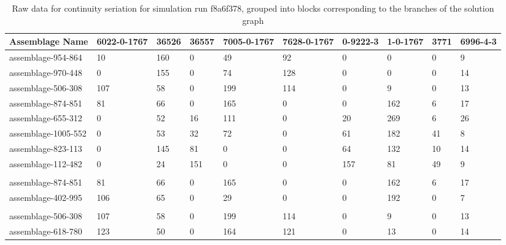 \begin{table}
\centering
\begin{tabular}{@{}llllllllll@{}}
\toprule
Assemblage Name & 6022-0-1767 & 36526 & 36557 & 7005-0-1767 & 7628-0-1767 & 0-9222-3 & 1-0-1767 & 3771 & 6996-4-3 \\ \midrule
assemblage-954-864 & 10 & 160 & 0 & 49 & 92 & 0 & 0 & 0 & 9 \\
assemblage-970-448 & 0 & 155 & 0 & 74 & 128 & 0 & 0 & 0 & 14 \\
assemblage-506-308 & 107 & 58 & 0 & 199 & 114 & 0 & 9 & 0 & 13 \\
assemblage-874-851 & 81 & 66 & 0 & 165 & 0 & 0 & 162 & 6 & 17 \\
assemblage-655-312 & 0 & 52 & 16 & 111 & 0 & 20 & 269 & 6 & 26 \\
assemblage-1005-552 & 0 & 53 & 32 & 72 & 0 & 61 & 182 & 41 & 8 \\
assemblage-823-113 & 0 & 145 & 81 & 0 & 0 & 64 & 132 & 10 & 14 \\
assemblage-112-482 & 0 & 24 & 151 & 0 & 0 & 157 & 81 & 49 & 9 \\
 &  &  &  &  &  &  &  &  &  \\
assemblage-874-851 & 81 & 66 & 0 & 165 & 0 & 0 & 162 & 6 & 17 \\
assemblage-402-995 & 106 & 65 & 0 & 29 & 0 & 0 & 192 & 0 & 7 \\
 &  &  &  &  &  &  &  &  &  \\
assemblage-506-308 & 107 & 58 & 0 & 199 & 114 & 0 & 9 & 0 & 13 \\
assemblage-618-780 & 123 & 50 & 0 & 164 & 121 & 0 & 13 & 0 & 14 \\ \bottomrule
\end{tabular}
\caption{Raw data for continuity seriation for simulation run f8a6f378, grouped into blocks corresponding to the branches of the solution graph}
\label{multser:tab:f8a6f378-cont-table}
\end{table}

